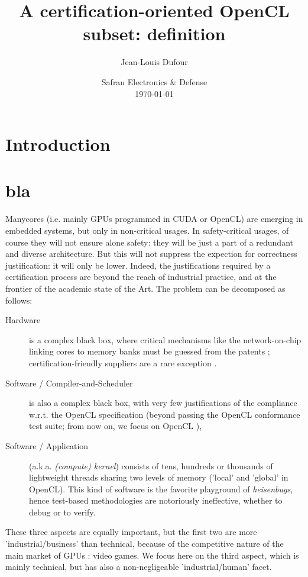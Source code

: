 \documentclass[a4paper,10pt]{article} %
\title{A certification-oriented OpenCL subset: definition}
\author{Jean-Louis Dufour}
\date{Safran Electronics \& Defense\\
\today
}
\begin{document}
\maketitle





\section{Introduction}

\cite{eigenmann1991experience}


\cite{gupta1997privatization}








\section{bla}

Manycores (i.e. mainly GPUs programmed in CUDA or OpenCL) are emerging in embedded systems, but only in non-critical usages.
In safety-critical usages, of course they will not ensure alone safety: they will be just a part of a redundant and diverse architecture.
But this will not suppress  the expection for correctness justification:  it will only be lower.
Indeed, the justifications required by a certification process are  beyond the reach of industrial practice,
and at the frontier of the academic state of the Art.
The problem can be decomposed as follows:
\begin{description}
\item[Hardware] is a complex black box, where critical mechanisms like the network-on-chip linking cores to memory banks must be guessed from the patents  \cite{aamodt2018general}; certification-friendly suppliers are a rare exception \cite{boyer2018computing}.
\item[Software / Compiler-and-Scheduler] is also a complex black box, with very few justifications of the compliance w.r.t. the OpenCL specification (beyond passing the OpenCL conformance test suite; from now on, we focus on OpenCL \cite{munshi2011opencl}),
\item[Software / Application] (a.k.a. \emph{(compute) kernel}) consists of tens, hundreds or thousands of lightweight threads sharing two levels of memory ('local' and 'global' in OpenCL). This kind of software is the favorite playground of \emph{heisenbugs}, hence test-based methodologies are notoriously ineffective, whether to debug or to verify.
\end{description}
These three aspects are equally important, but the first two are more 'industrial/business' than technical, because of the competitive nature of the main market of GPUs : video games. We focus here on the third aspect, which is mainly technical, but has also a non-negligeable 'industrial/human' facet.
\end{document}
